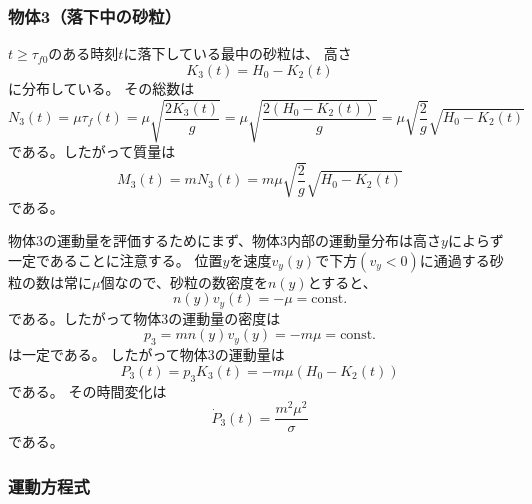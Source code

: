 \documentclass[dvipdfmx]{article}
\begin{document}
\subsubsection{物体3（落下中の砂粒）}
$t\ge \tau_{f0}$のある時刻$t$に落下している最中の砂粒は、
高さ
\begin{equation} \label{250919083726} 
   K_3(t) = H_0 - K_2(t)
\end{equation}
に分布している。
その総数は
\begin{equation} \label{250917175724} 
   N_3(t) = \mu \tau_f(t) = \mu \sqrt{\frac{2K_3(t)}{g}} = \mu \sqrt{\frac{2(H_0-K_2(t))}{g}} = \mu \sqrt{\frac{2}{g}}\sqrt{H_0-K_2(t)}
\end{equation}
である。したがって質量は
\begin{equation} \label{250917175839} 
   M_3(t) = mN_3(t) %
   		 = m\mu\sqrt{\frac{2}{g}}\sqrt{H_0-K_2(t)}
\end{equation}
である。



物体3の運動量を評価するためにまず、物体3内部の運動量分布は高さ$y$によらず一定であることに注意する。
位置$y$を速度$v_y(y)$で下方$(v_y<0)$に通過する砂粒の数は常に$\mu$個なので、砂粒の数密度を$n(y)$とすると、
\begin{equation} \label{250917101402} 
   n(y) v_y(t) = -\mu = \text{const.}
\end{equation}
である。したがって物体3の運動量の密度は
\begin{equation} \label{250917102631} 
   p_3 = mn(y)v_y(y)= -m \mu = \text{const.}
\end{equation}
は一定である。
したがって物体3の運動量は
\begin{equation} \label{250917102719} 
   P_3(t) =p_3 K_3(t) =  -m\mu(H_0-K_2(t))
\end{equation}
である。
その時間変化は
\begin{equation} \label{250919105348} 
   \dot{P}_3(t) = \frac{m^2\mu^2}{\sigma}
\end{equation}
である。


\subsubsection{運動方程式}
\end{document}
